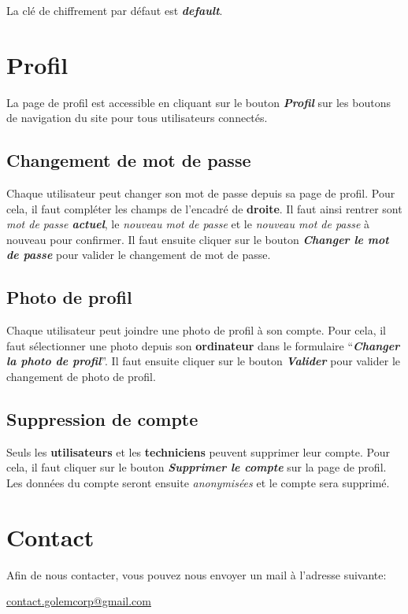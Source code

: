 \documentclass[12pt, a4paper]{article}
\begin{document}
\noindent La clé de chiffrement par défaut est \textit{\textbf{default}}.

\section{Profil}

La page de profil est accessible en cliquant sur le bouton \textit{\textbf{Profil}} sur les boutons de navigation du site pour tous utilisateurs connectés.

\subsection*{Changement de mot de passe}

Chaque utilisateur peut changer son mot de passe depuis sa page de profil.
Pour cela, il faut compléter les champs de l'encadré de \textbf{droite}.
Il faut ainsi rentrer sont \textit{mot de passe \textbf{actuel}}, le \textit{nouveau mot de passe} et le \textit{nouveau mot de passe} à nouveau pour confirmer.
Il faut ensuite cliquer sur le bouton \textit{\textbf{Changer le mot de passe}} pour valider le changement de mot de passe.

\subsection*{Photo de profil}

Chaque utilisateur peut joindre une photo de profil à son compte.
Pour cela, il faut sélectionner une photo depuis son \textbf{ordinateur} dans le formulaire ``\textit{\textbf{Changer la photo de profil}}''.
Il faut ensuite cliquer sur le bouton \textit{\textbf{Valider}} pour valider le changement de photo de profil.

\subsection*{Suppression de compte}

Seuls les \textbf{utilisateurs} et les \textbf{techniciens} peuvent supprimer leur compte.
Pour cela, il faut cliquer sur le bouton \textit{\textbf{Supprimer le compte}} sur la page de profil.
Les données du compte seront ensuite \textit{anonymisées} et le compte sera supprimé.

\section*{Contact}

Afin de nous contacter, vous pouvez nous envoyer un mail à l'adresse suivante:

\begin{center}
    \url{contact.golemcorp@gmail.com}
\end{center}
\end{document}

